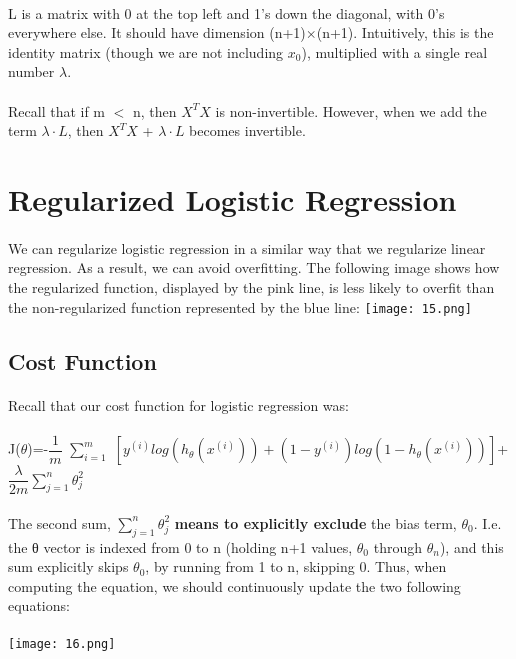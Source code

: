 \documentclass[UTF8]{ctexart}
\begin{document}
\paragraph{}
L is a matrix with 0 at the top left and 1's down the diagonal, with 0's everywhere else. It should have dimension (n+1)$\times$(n+1). Intuitively, this is the identity matrix (though we are not including $x_{0}$), multiplied with a single real number $\lambda.$
\paragraph{}
Recall that if m $<$ n, then $X^{T}X$ is non-invertible. However, when we add the term $\lambda \cdot L$, then $X^{T}X$ + $\lambda \cdot L$ becomes invertible.
\newpage
\section{Regularized Logistic Regression}
\paragraph{}
We can regularize logistic regression in a similar way that we regularize linear regression. As a result, we can avoid overfitting. The following image shows how the regularized function, displayed by the pink line, is less likely to overfit than the non-regularized function represented by the blue line:
\texttt{[image: 15.png]}
\subsection{Cost Function}
\paragraph{}
Recall that our cost function for logistic regression was:
\paragraph{}
\begin{algorithm}
J($\theta$)=-$\dfrac{1}{m}$ $\sum_{i=1}^m$ $\left[y^{(i)}log(h_{\theta}(x^{(i)}))+(1-y^{(i)})log(1-h_{\theta}(x^{(i)}))\right]$+$\dfrac{\lambda}{2m}\sum_{j=1}^n \theta_{j}^{2}$
\end{algorithm}
\paragraph{}
The second sum, $\sum_{j=1}^n \theta_{j}^{2}$ \textbf{means to explicitly exclude} the bias term, $\theta_{0}$. I.e. the θ vector is indexed from 0 to n (holding n+1 values, $\theta_{0}$ through $\theta_{n}$), and this sum explicitly skips $\theta_{0}$, by running from 1 to n, skipping 0. Thus, when computing the equation, we should continuously update the two following equations:
\paragraph{}
\texttt{[image: 16.png]}
\end{document}
